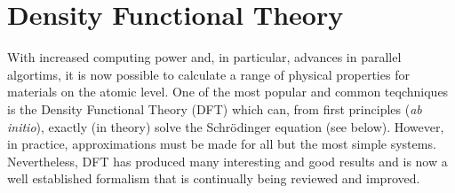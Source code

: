 \section{Density Functional Theory}
\label{sec:dft}

With increased computing power and, in particular, advances in parallel algortims, it is now possible to calculate a range of physical properties for materials on the atomic level.
One of the most popular and common teqchniques is the Density Functional Theory (DFT) which can, from first principles (\textit{ab initio}), exactly (in theory) solve the Schr\"odinger equation (see  below).
However, in practice, approximations must be made for all but the most simple systems.
Nevertheless, DFT has produced many interesting and good results and is now a well established formalism that is continually being reviewed and improved.

\recent

\unread



